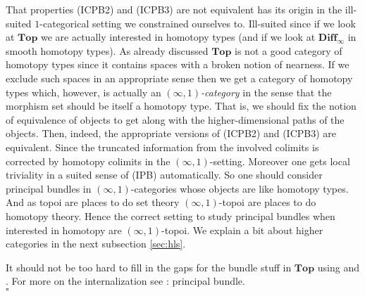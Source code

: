 \begin{exa}[Bundles 2]
\begin{enumerate}
\end{enumerate}
That properties (ICPB2) and (ICPB3) are not equivalent has its origin in the ill-suited $1$-categorical setting we constrained ourselves to. Ill-suited since if we look at $\mathbf{Top}$ we are actually interested in homotopy types (and if we look at $\mathbf{Diff}_{\infty}$ in smooth homotopy types). As already discussed $\mathbf{Top}$ is not a good category of homotopy types since it contains spaces with a broken notion of nearness. If we exclude such spaces in an appropriate sense then we get a category of homotopy types which, however, is actually an \textit{$(\infty,1)$-category} in the sense that the morphism set should be itself a homotopy type. That is, we should fix the notion of equivalence of objects to get along with the higher-dimensional paths of the objects. Then, indeed, the appropriate versions of (ICPB2) and (ICPB3) are equivalent. Since the truncated information from the involved colimits is corrected by homotopy colimits in the $(\infty,1)$-setting. Moreover one gets local triviality in a suited sense of (IPB) automatically. So one should consider principal bundles in $(\infty,1)$-categories whose objects are like homotopy types. And as topoi are places to do set theory $(\infty,1)$-topoi are places to do homotopy theory. Hence the correct setting to study principal bundles when interested in homotopy are $(\infty,1)$-topoi. We explain a bit about higher categories in the next subsection \ref{sec:hls}.
\end{exa}
\begin{prf}
It should not be too hard to fill in the gaps for the bundle stuff in $\mathbf{Top}$ using \cite{240b19f3} and \cite{797789bc}. For more on the internalization see \cite{wiki-nlab0000}: principal bundle.
\\
\phantom{proven}
\hfill
$\square$
\end{prf}
